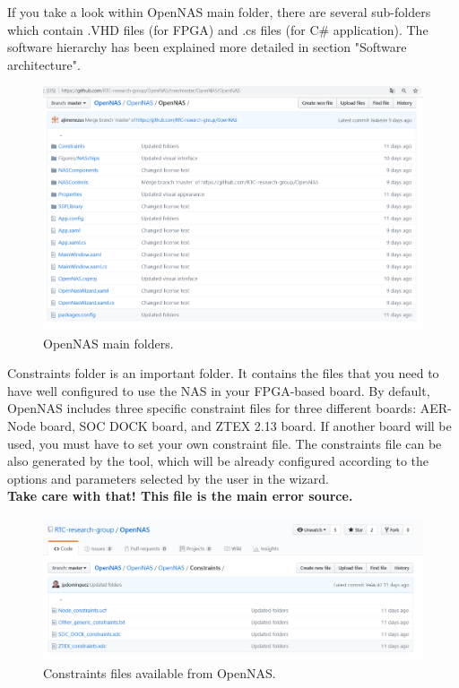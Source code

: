 If you take a look within OpenNAS main folder, there are several sub-folders which contain .VHD files (for FPGA) and .cs files (for C\# application). The software hierarchy has been explained more detailed in section "Software architecture".

\begin{figure}[H]
\centering
\includegraphics[width=1\textwidth]{images/Img04_OpenNAS_Project_Folders.PNG}
\caption{\label{fig:OpenNAS_folders}OpenNAS main folders.}
\end{figure}

Constraints folder is an important folder. It contains the files that you need to have well configured to use the NAS in your FPGA-based board. By default, OpenNAS includes three specific constraint files for three different boards: AER-Node board, SOC DOCK board, and ZTEX 2.13 board. If another board will be used, you must have to set your own constraint file. The constraints file can be also generated by the tool, which will be already configured according to the options and parameters selected by the user in the wizard.\\
\textbf{Take care with that! This file is the main error source.}

\begin{figure}[H]
\centering
\includegraphics[width=1\textwidth]{images/Img05_Constraints.PNG}
\caption{\label{fig:OpenNAS_Constraints}Constraints files available from OpenNAS.}
\end{figure}


